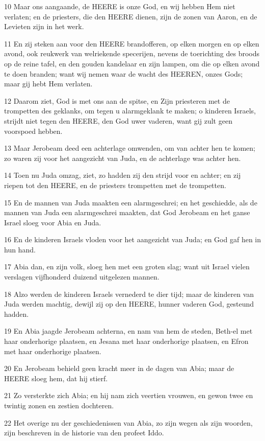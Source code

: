 \par 10 Maar ons aangaande, de HEERE is onze God, en wij hebben Hem niet verlaten; en de priesters, die den HEERE dienen, zijn de zonen van Aaron, en de Levieten zijn in het werk.
\par 11 En zij steken aan voor den HEERE brandofferen, op elken morgen en op elken avond, ook reukwerk van welriekende specerijen, nevens de toerichting des broods op de reine tafel, en den gouden kandelaar en zijn lampen, om die op elken avond te doen branden; want wij nemen waar de wacht des HEEREN, onzes Gods; maar gij hebt Hem verlaten.
\par 12 Daarom ziet, God is met ons aan de spitse, en Zijn priesteren met de trompetten des geklanks, om tegen u alarmgeklank te maken; o kinderen Israels, strijdt niet tegen den HEERE, den God uwer vaderen, want gij zult geen voorspoed hebben.
\par 13 Maar Jerobeam deed een achterlage omwenden, om van achter hen te komen; zo waren zij voor het aangezicht van Juda, en de achterlage was achter hen.
\par 14 Toen nu Juda omzag, ziet, zo hadden zij den strijd voor en achter; en zij riepen tot den HEERE, en de priesters trompetten met de trompetten.
\par 15 En de mannen van Juda maakten een alarmgeschrei; en het geschiedde, als de mannen van Juda een alarmgeschrei maakten, dat God Jerobeam en het ganse Israel sloeg voor Abia en Juda.
\par 16 En de kinderen Israels vloden voor het aangezicht van Juda; en God gaf hen in hun hand.
\par 17 Abia dan, en zijn volk, sloeg hen met een groten slag; want uit Israel vielen verslagen vijfhonderd duizend uitgelezen mannen.
\par 18 Alzo werden de kinderen Israels vernederd te dier tijd; maar de kinderen van Juda werden machtig, dewijl zij op den HEERE, hunner vaderen God, gesteund hadden.
\par 19 En Abia jaagde Jerobeam achterna, en nam van hem de steden, Beth-el met haar onderhorige plaatsen, en Jesana met haar onderhorige plaatsen, en Efron met haar onderhorige plaatsen.
\par 20 En Jerobeam behield geen kracht meer in de dagen van Abia; maar de HEERE sloeg hem, dat hij stierf.
\par 21 Zo versterkte zich Abia; en hij nam zich veertien vrouwen, en gewon twee en twintig zonen en zestien dochteren.
\par 22 Het overige nu der geschiedenissen van Abia, zo zijn wegen als zijn woorden, zijn beschreven in de historie van den profeet Iddo.

